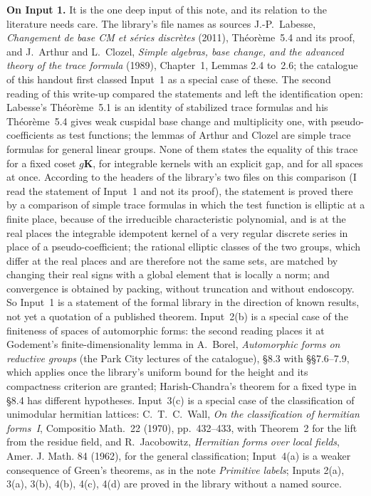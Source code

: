 \documentclass[11pt,a4paper]{article}
\newcommand{\subhead}[1]{\par\addvspace{9pt plus 2pt}\Needspace{4\baselineskip}\noindent\textbf{#1}\enspace\ignorespaces}
\theoremstyle{plainx}
\theoremstyle{uprightx}
\begin{document}
\subhead{On Input 1.} It is the one deep input of this note, and its relation to the literature needs care. The
library's file names as sources J.-P.~Labesse, \emph{Changement de base CM et séries discrètes} (2011),
Théorème~5.4 and its proof, and J.~Arthur and L.~Clozel, \emph{Simple algebras, base change, and the advanced theory
of the trace formula} (1989), Chapter~1, Lemmas 2.4 to~2.6; the catalogue of this handout first classed Input~1 as
a special case of these. The second reading of this write-up compared the statements and left the identification
open: Labesse's Théorème~5.1 is an identity of stabilized trace formulas and his Théorème~5.4 gives weak cuspidal
base change and multiplicity one, with pseudo-coefficients as test functions; the lemmas of Arthur and Clozel are
simple trace formulas for general linear groups. None of them states the equality of this trace for a fixed coset
$g\mathbf K$, for integrable kernels with an explicit gap, and for all spaces at once. According to the headers of the library's two files on this comparison (I read the statement of Input~1 and
not its proof), the statement is proved there by a comparison of simple trace formulas in which the test function
is elliptic at a finite place, because of the irreducible characteristic polynomial, and is at the real places
the integrable idempotent kernel of a very regular discrete series in place of a pseudo-coefficient; the rational
elliptic classes of the two groups, which differ at the real places and are therefore not the same sets, are
matched by changing their real signs with a global element that is locally a norm; and convergence is obtained by
packing, without truncation and without endoscopy. So Input~1 is a statement of the formal library
in the direction of known results, not yet a quotation of a published theorem. Input~2(b) is a special case of the
finiteness of spaces of automorphic forms: the second reading places it at Godement's finite-dimensionality
lemma in A.~Borel, \emph{Automorphic forms on reductive groups} (the Park City lectures of the catalogue), §8.3
with §§7.6--7.9, which applies once the library's uniform bound for the height and its compactness criterion are
granted; Harish-Chandra's theorem for a fixed type in §8.4 has different hypotheses. Input~3(c) is a special case
of the classification of unimodular hermitian lattices: C.~T.~C.~Wall, \emph{On the classification of hermitian
forms~I}, Compositio Math.~22 (1970), pp.~432--433, with Theorem~2 for the lift from the residue field, and
R.~Jacobowitz, \emph{Hermitian forms over local fields}, Amer. J. Math. 84 (1962), for the general
classification; Input~4(a) is a weaker consequence of Green's theorems, as in the note
\emph{Primitive labels}; Inputs 2(a), 3(a), 3(b), 4(b), 4(c), 4(d) are proved in the library without a named
source.
\end{document}

